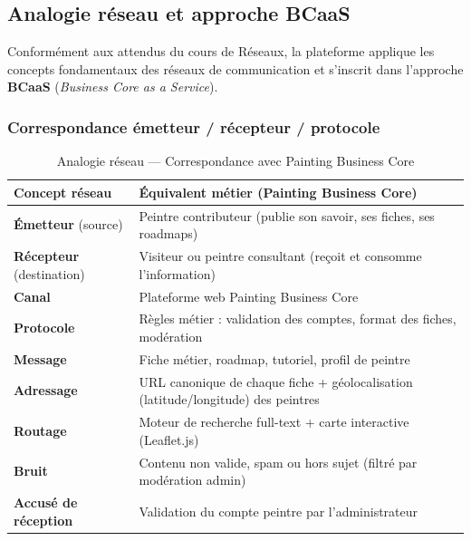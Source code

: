 \documentclass[12pt,a4paper]{report}
\begin{document}
\subsection{Analogie réseau et approche BCaaS}

Conformément aux attendus du cours de Réseaux, la plateforme applique les concepts fondamentaux des réseaux de communication et s'inscrit dans l'approche \textbf{BCaaS} (\textit{Business Core as a Service}).

\subsubsection*{Correspondance émetteur / récepteur / protocole}

\begin{table}[H]
\centering
\caption{Analogie réseau --- Correspondance avec Painting Business Core}
\label{tab:network_analogy}
\small
\begin{tabular}{|p{}|p{}|}
\hline
\textbf{Concept réseau} & \textbf{Équivalent métier (Painting Business Core)} \\
\hline
\textbf{Émetteur} (source) & Peintre contributeur (publie son savoir, ses fiches, ses roadmaps) \\
\hline
\textbf{Récepteur} (destination) & Visiteur ou peintre consultant (reçoit et consomme l'information) \\
\hline
\textbf{Canal} & Plateforme web Painting Business Core \\
\hline
\textbf{Protocole} & Règles métier : validation des comptes, format des fiches, modération \\
\hline
\textbf{Message} & Fiche métier, roadmap, tutoriel, profil de peintre \\
\hline
\textbf{Adressage} & URL canonique de chaque fiche + géolocalisation (latitude/longitude) des peintres \\
\hline
\textbf{Routage} & Moteur de recherche full-text + carte interactive (Leaflet.js) \\
\hline
\textbf{Bruit} & Contenu non valide, spam ou hors sujet (filtré par modération admin) \\
\hline
\textbf{Accusé de réception} & Validation du compte peintre par l'administrateur \\
\hline
\end{tabular}
\end{table}
\end{document}
